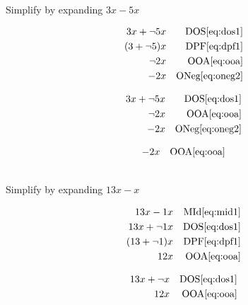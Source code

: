 \documentclass[20150903-160354-rs2.2-MarksMathNotebook.tex]{subfiles}
\begin{document}
\begin{example}[id:20141121-193636] \label{20141121-193636} \hfill \\

Simplify by expanding $3x-5x$

\soln

\solnsteps
\begin{align*}
3x + \neg 5x && \text{DOS} \eqref{eq:dos1} \\
(3+ \neg 5)x && \text{DPF} \eqref{eq:dpf1} \\
\neg 2x && \text{OOA} \eqref{eq:ooa} \\
-2x && \text{ONeg} \eqref{eq:oneg2}
\end{align*}

\soln

\lesssteps
\begin{align*}
3x + \neg 5x && \text{DOS} \eqref{eq:dos1} \\
\neg 2x && \text{OOA} \eqref{eq:ooa} \\
-2x && \text{ONeg} \eqref{eq:oneg2}
\end{align*}

\soln

\lesssteps
\begin{align*}
-2x && \text{OOA} \eqref{eq:ooa}
\end{align*}

\end{example}

\begin{example}[id:20141106-150622] \label{20141106-150622}  \hfill \\

Simplify by expanding $13x-x$

\soln

\solnsteps
\begin{align*}
13x-1x && \text{MId} \eqref{eq:mid1} \\
13x+\neg 1x && \text{DOS} \eqref{eq:dos1} \\
(13+\neg 1)x && \text{DPF} \eqref{eq:dpf1} \\
12x && \text{OOA} \eqref{eq:ooa}
\end{align*}

\soln

\lesssteps
\begin{align*}
13x + \neg x && \text{DOS} \eqref{eq:dos1} \\
12 x && \text{OOA} \eqref{eq:ooa}
\end{align*}
\end{example}
\end{document}

